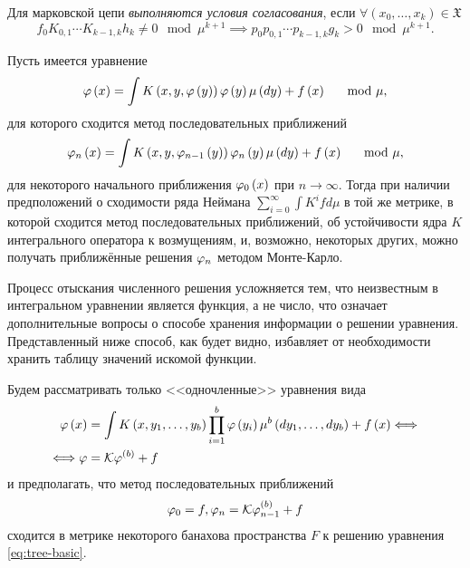 Для марковской цепи \emph{выполняются условия согласования}, если $\forall \left(x_0, \ldots, x_k\right) \in \mathfrak{X}$
	\[
		f_0 K_{0,1}\cdots K_{k-1, k} h_k \not = 0 \mod \mu^{k+1} \implies p_0 p_{0,1}\cdots p_{k-1, k} g_k > 0 \mod \mu^{k+1}.
	\]
\newpage

Пусть имеется уравнение 
\begin{equation}
	\varphi\left(x\right) = \int K\left(x, y, \varphi\left(y\right)\right)\varphi\left(y\right) \mu\left(dy\right) + f\left(x\right) \quad \mod \mu,
\end{equation}
для которого сходится метод последовательных приближений
\begin{equation}
	\varphi_n\left(x\right) = \int K\left(x, y, \varphi_{n-1}\left(y\right)\right)\varphi_n\left(y\right) \mu\left(dy\right) + f\left(x\right) \quad \mod \mu,
\end{equation}
для некоторого начального приближения $\varphi_0\left(x\right)$ при $n\to\infty$. Тогда при наличии предположений о сходимости ряда Неймана $\sum_{i=0}^\infty \int K^i f d\mu$ в той же метрике, в которой сходится метод последовательных приближений, об устойчивости ядра $K$ интегрального оператора к возмущениям, и, возможно, некоторых других, можно получать приближённые решения $\varphi_n$ методом Монте-Карло.

Процесс отыскания численного решения усложняется тем, что неизвестным в интегральном уравнении является функция, а не число, что означает дополнительные вопросы о способе хранения информации о решении уравнения. Представленный ниже способ, как будет видно, избавляет от необходимости хранить таблицу значений искомой функции.

Будем рассматривать только <<одночленные>> уравнения вида 
\begin{align}
	\varphi\left(x\right) &= \int K\left(x, y_1, \ldots,y_b\right)\prod_{i=1}^b\varphi\left(y_i\right)\mu^b\left(dy_1, \ldots,dy_b\right) + f\left(x\right) \Longleftrightarrow \label{eq:tree-basic}\\
	\Longleftrightarrow \varphi &= \mathcal{K}\varphi^{\left(b\right)} + f \nonumber
\end{align}
и предполагать, что метод последовательных приближений $$\label{eq:consecutive-approximations}\varphi_0 = f, \varphi_n = \mathcal{K}\varphi_{n-1}^{(b)} + f$$ сходится в метрике некоторого банахова пространства $F$ к решению уравнения \eqref{eq:tree-basic}.

